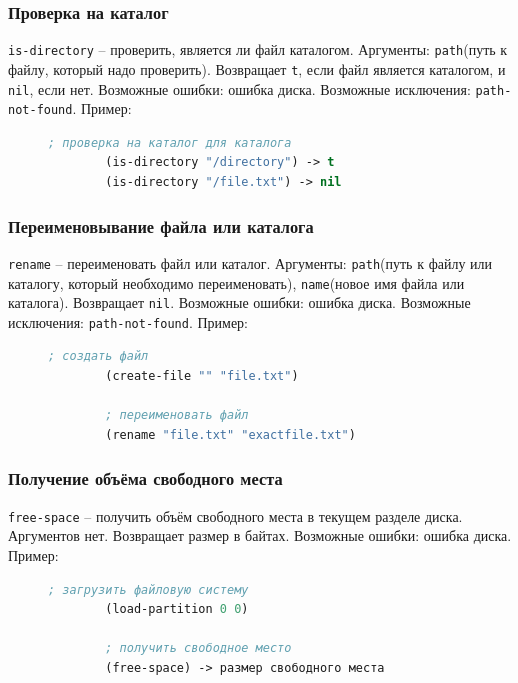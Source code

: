 \subsubsection{Проверка на каталог}

\texttt{is-directory} -- проверить, является ли файл каталогом. Аргументы: \texttt{path}(путь к файлу, который надо проверить). Возвращает \texttt{t}, если файл является каталогом, и \texttt{nil}, если нет. Возможные ошибки: ошибка диска. Возможные исключения: \texttt{path-not-found}. Пример:
\begin{figure}[H]
	\begin{lstlisting}[language=Lisp]
		; проверка на каталог для каталога
		(is-directory "/directory") -> t
		(is-directory "/file.txt") -> nil
	\end{lstlisting}
\end{figure}

\subsubsection{Переименовывание файла или каталога}

\texttt{rename} -- переименовать файл или каталог. Аргументы: \texttt{path}(путь к файлу или каталогу, который необходимо переименовать), \texttt{name}(новое имя файла или каталога). Возвращает \texttt{nil}. Возможные ошибки: ошибка диска. Возможные исключения: \texttt{path-not-found}. Пример:
\begin{figure}[H]
	\begin{lstlisting}[language=Lisp]
		; создать файл
		(create-file "" "file.txt")
		
		; переименовать файл
		(rename "file.txt" "exactfile.txt")
	\end{lstlisting}
\end{figure}

\subsubsection{Получение объёма свободного места}

\texttt{free-space} -- получить объём свободного места в текущем разделе диска. Аргументов нет. Возвращает размер в байтах. Возможные ошибки: ошибка диска. Пример:
\begin{figure}[H]
	\begin{lstlisting}[language=Lisp]
		; загрузить файловую систему
		(load-partition 0 0)
		
		; получить свободное место
		(free-space) -> размер свободного места
	\end{lstlisting}
\end{figure}

